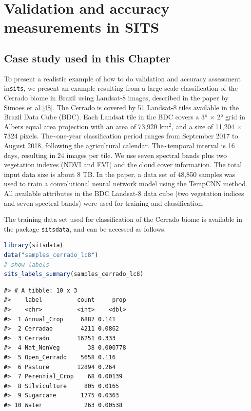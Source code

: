 \documentclass[
  11pt,
]{report}
\newcommand{\passthrough}[1]{#1}
\begin{document}
\hypertarget{validation-and-accuracy-measurements-in-sits}{%
\chapter*{Validation and accuracy measurements in
SITS}\label{validation-and-accuracy-measurements-in-sits}}

\hypertarget{case-study-used-in-this-chapter}{%
\section*{Case study used in this
Chapter}\label{case-study-used-in-this-chapter}}

To present a realistic example of how to do validation and accuracy
assessment in\passthrough{\lstinline!sits!}, we present an example
resulting from a large-scale classification of the Cerrado biome in
Brazil using Landsat-8 images, described in the paper by Simoes et
al.\protect\hyperlink{ref-Simoes2021}{{[}48{]}}. The Cerrado is covered
by 51 Landsat-8 tiles available in the Brazil Data Cube (BDC). Each
Landsat tile in the BDC covers a 3° \(\times\) 2° grid in Albers equal
area projection with an area of 73,920 km\(^2\), and a size of 11,204
\(\times\) 7324 pixels. The\textasciitilde one-year classification
period ranges from September 2017 to August 2018, following the
agricultural calendar. The\textasciitilde temporal interval is 16 days,
resulting in 24 images per tile. We use seven spectral bands plus two
vegetation indexes (NDVI and EVI) and the cloud cover information. The
total input data size is about 8 TB. In the paper, a data set of 48,850
samples was used to train a convolutional neural network model using the
TempCNN method. All available attributes in the BDC Landsat-8 data cube
(two vegetation indices and seven spectral bands) were used for training
and classification.

The training data set used for classification of the Cerrado biome is
available in the package \passthrough{\lstinline!sitsdata!}, and can be
accessed as follows.

\begin{lstlisting}[language=R]
library(sitsdata)
data("samples_cerrado_lc8")
# show labels 
sits_labels_summary(samples_cerrado_lc8)
\end{lstlisting}

\begin{lstlisting}
#> # A tibble: 10 x 3
#>    label          count     prop
#>    <chr>          <int>    <dbl>
#>  1 Annual_Crop     6887 0.141   
#>  2 Cerradao        4211 0.0862  
#>  3 Cerrado        16251 0.333   
#>  4 Nat_NonVeg        38 0.000778
#>  5 Open_Cerrado    5658 0.116   
#>  6 Pasture        12894 0.264   
#>  7 Perennial_Crop    68 0.00139 
#>  8 Silviculture     805 0.0165  
#>  9 Sugarcane       1775 0.0363  
#> 10 Water            263 0.00538
\end{lstlisting}
\end{document}
